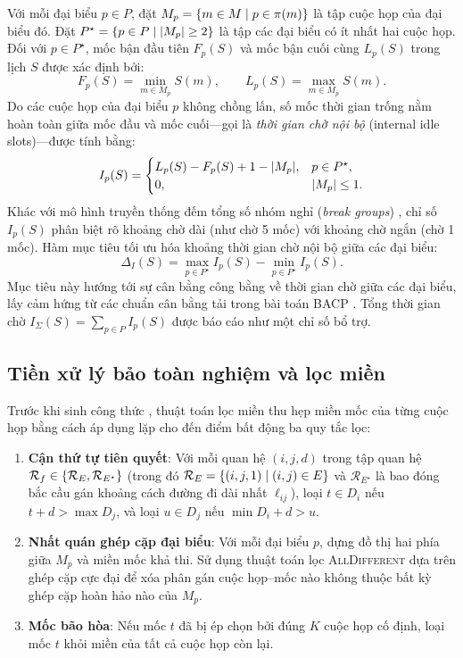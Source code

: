 Với mỗi đại biểu \(p\in P\), đặt \(M_p = \left\{m\in M \;\middle|\; p\in\pi(m)\right\}\) là tập cuộc họp của đại biểu đó. Đặt \(P^\star = \left\{p\in P \;\middle|\; \lvert M_p\rvert\ge 2\right\}\) là tập các đại biểu có ít nhất hai cuộc họp. Đối với \(p\in P^\star\), mốc bận đầu tiên \(F_p(S)\) và mốc bận cuối cùng \(L_p(S)\) trong lịch \(S\) được xác định bởi:
\[
  F_p(S) = \min_{m\in M_p} S(m), \qquad L_p(S) = \max_{m\in M_p} S(m).
\]
Do các cuộc họp của đại biểu \(p\) không chồng lấn, số mốc thời gian trống nằm hoàn toàn giữa mốc đầu và mốc cuối---gọi là \emph{thời gian chờ nội bộ} (internal idle slots)---được tính bằng:
\begin{equation}
  I_p(S) =
  \begin{cases}
    L_p(S) - F_p(S) + 1 - \lvert M_p\rvert, & p\in P^\star,\\
    0, & \lvert M_p\rvert\le 1.
  \end{cases}
  \label{eq:b2b-internal-idle}
\end{equation}
Khác với mô hình truyền thống đếm tổng số nhóm nghỉ (\emph{break groups}) \parencite{bofill2022b2b}, chỉ số \(I_p(S)\) phân biệt rõ khoảng chờ dài (như chờ 5 mốc) với khoảng chờ ngắn (chờ 1 mốc). Hàm mục tiêu tối ưu hóa khoảng thời gian chờ nội bộ giữa các đại biểu:
\begin{equation}
  \Delta_I(S) = \max_{p\in P^\star} I_p(S) - \min_{p\in P^\star} I_p(S).
  \label{eq:b2b-idle-range}
\end{equation}
Mục tiêu này hướng tới sự cân bằng công bằng về thời gian chờ giữa các đại biểu, lấy cảm hứng từ các chuẩn cân bằng tải trong bài toán BACP \parencite{chiarandini2012}. Tổng thời gian chờ \(I_\Sigma(S)=\sum_{p\in P}I_p(S)\) được báo cáo như một chỉ số bổ trợ.

\subsection{Tiền xử lý bảo toàn nghiệm và lọc miền}

Trước khi sinh công thức \CNF, thuật toán lọc miền \parencite{nguyen2026compactsatmaxsatencodings} thu hẹp miền mốc của từng cuộc họp bằng cách áp dụng lặp cho đến điểm bất động ba quy tắc lọc:
\begin{enumerate}
  \item \textbf{Cận thứ tự tiên quyết}: Với mỗi quan hệ \((i,j,d)\) trong tập quan hệ \(\mathcal R_f\in\left\{\mathcal R_E, \mathcal R_{E^\star}\right\}\) (trong đó \(\mathcal R_E = \left\{(i,j,1) \;\middle|\; (i,j)\in E\right\}\) và \(\mathcal R_{E^\star}\) là bao đóng bắc cầu gán khoảng cách đường đi dài nhất \(\ell_{ij}\)), loại \(t\in D_i\) nếu \(t+d > \max D_j\), và loại \(u\in D_j\) nếu \(\min D_i+d > u\).
  \item \textbf{Nhất quán ghép cặp đại biểu}: Với mỗi đại biểu \(p\), dựng đồ thị hai phía giữa \(M_p\) và miền mốc khả thi. Sử dụng thuật toán lọc \textsc{AllDifferent} dựa trên ghép cặp cực đại \parencite{regin1994alldiff} để xóa phân gán cuộc họp--mốc nào không thuộc bất kỳ ghép cặp hoàn hảo nào của \(M_p\).
  \item \textbf{Mốc bão hòa}: Nếu mốc \(t\) đã bị ép chọn bởi đúng \(K\) cuộc họp cố định, loại mốc \(t\) khỏi miền của tất cả cuộc họp còn lại.
\end{enumerate}

